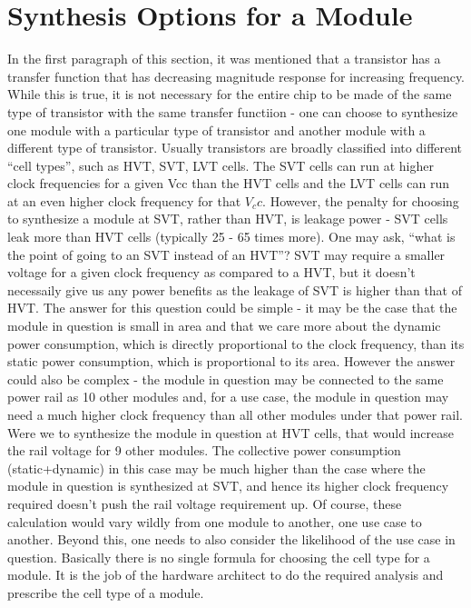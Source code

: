 \section{Synthesis Options for a Module}
In the first paragraph of this section, it was mentioned that a transistor has a transfer function that has decreasing magnitude response for increasing frequency. While this is true, it is not necessary for the entire chip to be made of the same type of transistor with the same transfer functiion - one can choose to synthesize one module with a particular type of transistor and another module with a different type of transistor. Usually transistors are broadly classified into different ``cell types'', such as HVT, SVT, LVT cells. The SVT cells can run at higher clock frequencies for a given Vcc than the HVT cells and the LVT cells can run at an even higher clock frequency for that $V_cc$. However, the penalty for choosing to synthesize a module at SVT, rather than HVT, is leakage power - SVT cells leak more than HVT cells (typically 25 - 65 times more). One may ask, ``what is the point of going to an SVT instead of an HVT''? SVT may require a smaller voltage for a given clock frequency as compared to a HVT, but it doesn't necessaily give us any power benefits as the leakage of SVT is higher than that of HVT. The answer for this question could be simple - it may be the case that the module in question is small in area and that we care more about the dynamic power consumption, which is directly proportional to the clock frequency, than its static power consumption, which is proportional to its area. However the answer could also be complex - the module in question may be connected to the same power rail as 10 other modules and, for a use case, the module in question may need a much higher clock frequency than all other modules under that power rail. Were we to synthesize the module in question at HVT cells, that would increase the rail voltage for 9 other modules. The collective power consumption (static+dynamic) in this case may be much higher than the case where the module in question is synthesized at SVT, and hence its higher clock frequency required doesn't push the rail voltage requirement up. Of course, these calculation would vary wildly from one module to another, one use case to another. Beyond this, one needs to also consider the likelihood of the use case in question. Basically there is no single formula for choosing the cell type for a module. It is the job of the hardware architect to do the required analysis and prescribe the cell type of a module.

